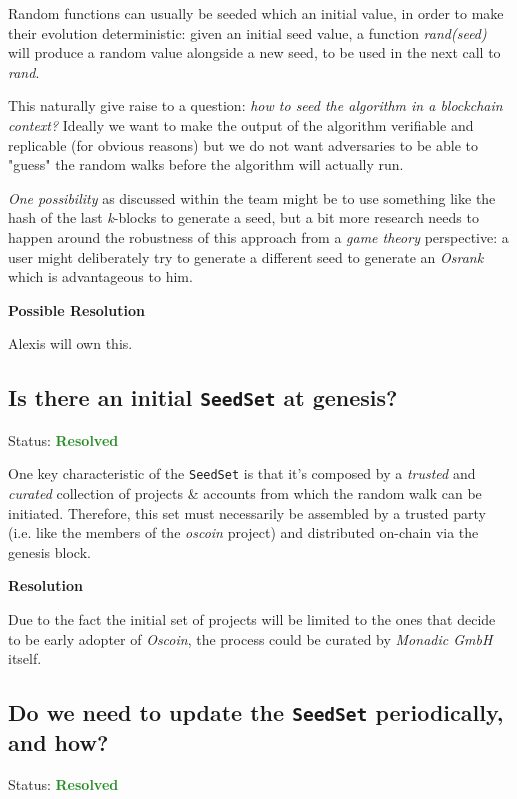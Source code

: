 \documentclass{article}
\begin{document}
Random functions can usually be seeded which an initial value, in order to
make their evolution deterministic: given an initial seed value, a function
\textit{rand(seed)} will produce a random value alongside a new seed, to be
used in the next call to \textit{rand}.

This naturally give raise to a question: \textit{how to seed the algorithm in a
blockchain context?} Ideally we want to make the output of the algorithm
verifiable and replicable (for obvious reasons) but we do not want
adversaries to be able to "guess" the random walks before the algorithm will
actually run.

\textit{One possibility} as discussed within the team might be to use something
like the hash of the last \textit{k}-blocks to generate a seed, but a bit more
research needs to happen around the robustness of this approach from a
\textit{game theory} perspective: a user might deliberately try to generate
a different seed to generate an \textit{Osrank} which is advantageous to him.

\textbf{Possible Resolution}

Alexis will own this.

\subsection{Is there an initial \texttt{SeedSet} at genesis?}

Status: \textcolor{ForestGreen}{\textbf{Resolved}}

One key characteristic of the \texttt{SeedSet} is that it's composed by a
\textit{trusted} and \textit{curated} collection of projects \& accounts from
which the random walk can be initiated. Therefore, this set must necessarily
be assembled by a trusted party (i.e. like the members of the \textit{oscoin}
project) and distributed on-chain via the genesis block.

\textbf{Resolution}

Due to the fact the initial set of projects will be limited to the ones that
decide to be early adopter of \textit{Oscoin}, the process could be curated
by \textit{Monadic GmbH} itself.

\subsection{Do we need to update the \texttt{SeedSet} periodically, and how?}

Status: \textcolor{ForestGreen}{\textbf{Resolved}}
\end{document}
